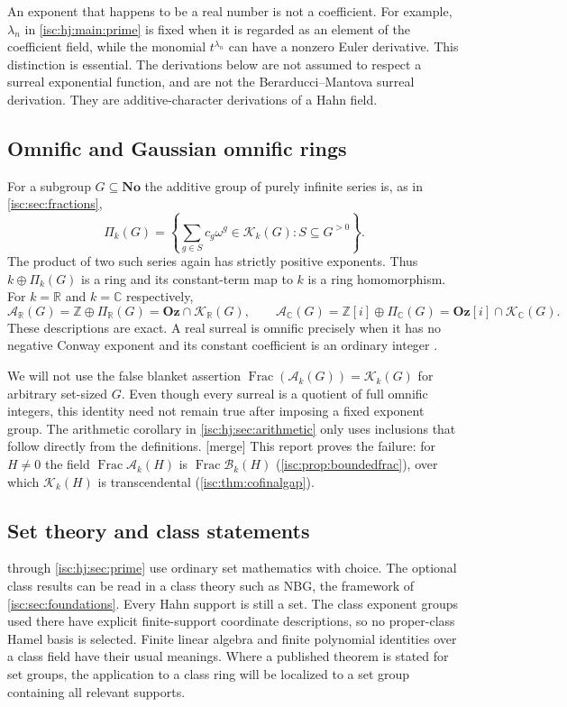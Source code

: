 \documentclass[11pt,letterpaper]{article}
\theoremstyle{definition}
\theoremstyle{remark}
\newcommand{\No}{\mathbf{No}}
\newcommand{\Oz}{\mathbf{Oz}}
\newcommand{\R}{\mathbb R}
\newcommand{\C}{\mathbb C}
\newcommand{\Z}{\mathbb Z}
\newcommand{\K}[2]{\mathcal K_{#1}(#2)}
\newcommand{\A}[2]{\mathcal A_{#1}(#2)}
\newcommand{\B}[2]{\mathcal B_{#1}(#2)}
\newcommand{\PiG}[2]{\Pi_{#1}(#2)}
\newcommand{\Frac}{\operatorname{Frac}}
\newcommand{\mtag}{\textup{[merge]}}%
\numberwithin{equation}{section}
\begin{document}
An exponent that happens to be a real number is not a coefficient.
For example, $\lambda_n$ in \cref{isc:hj:main:prime} is fixed when it is
regarded as an element of the coefficient field, while the monomial
$t^{\lambda_n}$ can have a nonzero Euler derivative. This distinction is
essential. The derivations below are not assumed to respect a surreal
exponential function, and are not the Berarducci--Mantova surreal
derivation. They are additive-character derivations of a Hahn field.

\subsection{Omnific and Gaussian omnific rings}

For a subgroup $G\subseteq\No$ the additive group of purely infinite series
is, as in \cref{isc:sec:fractions},
\[
 \PiG{k}{G}=\left\{\sum_{g\in S}c_g\omega^g\in\K{k}{G}:
 S\subseteq G^{>0}\right\}.
\]
The product of two such series again has strictly positive exponents.
Thus $k\oplus\PiG{k}{G}$ is a ring and its constant-term map to $k$ is a
ring homomorphism. For $k=\R$ and $k=\C$ respectively,
\[
 \A{\R}{G}=\Z\oplus\PiG{\R}{G}=\Oz\cap\K{\R}{G},
 \qquad
 \A{\C}{G}=\Z[i]\oplus\PiG{\C}{G}=\Oz[i]\cap\K{\C}{G}.
\]
These descriptions are exact. A real surreal is omnific precisely when
it has no negative Conway exponent and its constant coefficient is an
ordinary integer \cite{Conway,Gonshor}.

We will not use the false blanket assertion
$\Frac(\A{k}{G})=\K{k}{G}$ for arbitrary set-sized $G$.
Even though every surreal is a quotient of full omnific integers, this
identity need not remain true after imposing a fixed exponent group.
The arithmetic corollary in \cref{isc:hj:sec:arithmetic} only uses
inclusions that follow directly from the definitions.
\mtag{} This report proves the failure: for $H\ne0$ the field
$\Frac\A{k}{H}$ is $\Frac\B{k}{H}$ (\cref{isc:prop:boundedfrac}), over which
$\K{k}{H}$ is transcendental (\cref{isc:thm:cofinalgap}).

\subsection{Set theory and class statements}

 through \cref{isc:hj:sec:prime} use
ordinary set mathematics with choice. The optional class results can be
read in a class theory such as NBG, the framework of
\cref{isc:sec:foundations}. Every Hahn support is still a set. The class
exponent groups used there have explicit finite-support coordinate
descriptions, so no proper-class Hamel basis is selected. Finite linear
algebra and finite polynomial identities over a class field have their
usual meanings. Where a published theorem is stated for set groups, the
application to a class ring will be localized to a set group containing all
relevant supports.
\end{document}
